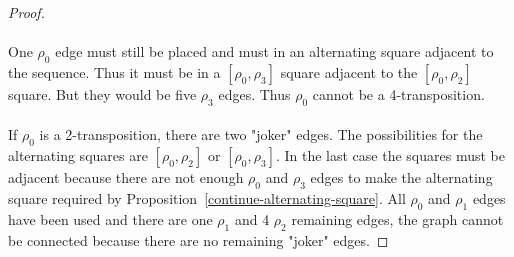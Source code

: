 \begin{proof}
  \begin{figure}[H]
    \begin{center}
      \caption{}
    \end{center}
  \end{figure}

  \paragraph{}
  One $\rho_0$ edge must still be placed and must in an alternating square adjacent to the sequence. Thus it must be in a $[\rho_0, \rho_3]$ square adjacent to the $[\rho_0, \rho_2]$ square. But they would be five $\rho_3$ edges. Thus $\rho_0$ cannot be a 4-transposition.

  \paragraph{}
  If $\rho_0$ is a 2-transposition, there are two "joker" edges. The possibilities for the alternating squares are $[\rho_0, \rho_2]$ or $[\rho_0, \rho_3]$. In the last case the squares must be adjacent because there are not enough $\rho_0$ and $\rho_3$ edges to make the alternating square required by Proposition~\ref{continue-alternating-square}. All $\rho_0$ and $\rho_1$ edges have been used and there are one $\rho_1$ and 4 $\rho_2$ remaining edges, the graph cannot be connected because there are no remaining "joker" edges.


\end{proof}
